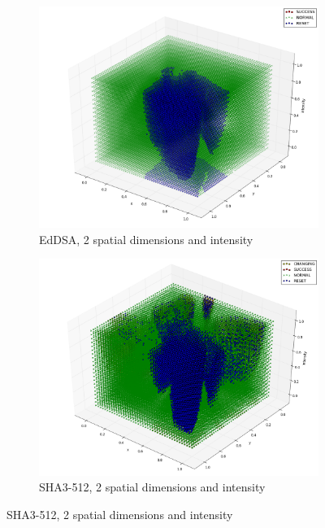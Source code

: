 \documentclass[times, utf8, diplomski]{fer}
\begin{document}
\begin{figure}[htbp]
    \begin{subfigure}[b]{0.48\textwidth}
        \includegraphics[width=0.95\linewidth]{images/plots/EdDSA_space_all_3D.png}
        \caption{EdDSA, 2 spatial dimensions and intensity}
    \end{subfigure}
    \hspace{8pt}
    \begin{subfigure}[b]{0.48\textwidth}
        \includegraphics[width=0.95\linewidth]{images/plots/Keccak_space_all_3D.png}
        \caption{SHA3-512, 2 spatial dimensions and intensity}
    \end{subfigure}


\end{figure}
\end{document}
